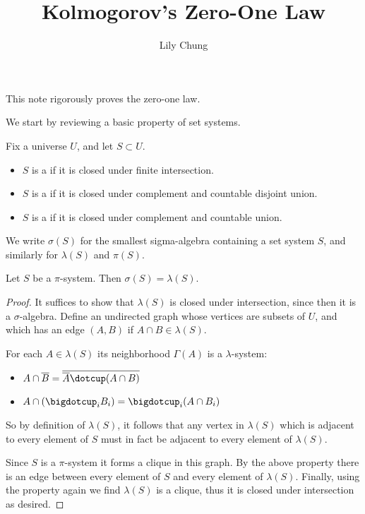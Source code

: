 \documentclass[11pt,a4paper]{article}
\title{Kolmogorov's Zero-One Law}
\author{
  Lily Chung
}
\date{}
\begin{document}
\maketitle

This note rigorously proves the zero-one law.

We start by reviewing a basic property of set systems.

\begin{definition}
  Fix a universe $U$, and let $S \subset U$.
  \begin{itemize}
  \item $S$ is a  if it is closed under finite intersection.
  \item $S$ is a  if it is closed under complement and countable disjoint union.
  \item $S$ is a  if it is closed under complement and countable union.
  \end{itemize}
\end{definition}

We write $\sigma(S)$ for the smallest sigma-algebra containing a set system $S$, and similarly for $\lambda(S)$ and $\pi(S)$.

\begin{theorem}
  \label{thm:dynkin}
  Let $S$ be a $\pi$-system.  Then $\sigma(S) = \lambda(S)$.
\end{theorem}
\begin{proof}
  It suffices to show that $\lambda(S)$ is closed under intersection,
  since then it is a $\sigma$-algebra.
  Define an undirected graph whose vertices are subsets of $U$,
  and which has an edge $(A, B)$ if $A \cap B \in \lambda(S)$.

  For each $A \in \lambda(S)$ its neighborhood $\Gamma(A)$ is a $\lambda$-system:
  \begin{itemize}
  \item $A \cap \overline{B} = \overline{\overline{A} \dotcup (A \cap B)}$
  \item $A \cap \left(\bigdotcup_i B_i\right) = \bigdotcup_i (A \cap B_i)$
  \end{itemize}
  So by definition of $\lambda(S)$, it follows that any vertex in $\lambda(S)$ which is adjacent to every element of $S$ must in fact be adjacent to every element of $\lambda(S)$.

  Since $S$ is a $\pi$-system it forms a clique in this graph.
  By the above property there is an edge between every element of $S$ and every element of $\lambda(S)$.
  Finally, using the property again we find $\lambda(S)$ is a clique,
  thus it is closed under intersection as desired.
\end{proof}
\end{document}
